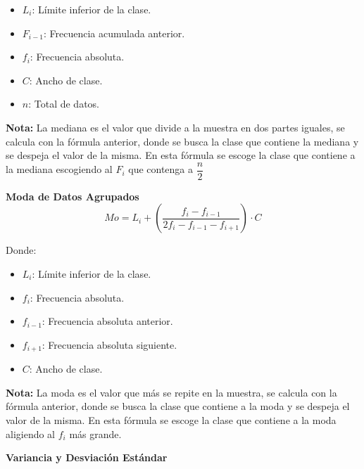 \documentclass[11pt, a4paper]{article}
\newenvironment{medianaDatosAgrupados}{}{}
\newenvironment{modaDatosAgrupados}{}{}
\newenvironment{varianciaYDesviacionEstandar}{}{}
\begin{document}
\begin{multicols}{2}
\begin{medianaDatosAgrupados}
\begin{itemize}
            \item $L_i$: Límite inferior de la clase.
            \item $F_{i-1}$: Frecuencia acumulada anterior.
            \item $f_i$: Frecuencia absoluta.
            \item $C$: Ancho de clase.
            \item $n$: Total de datos.
        \end{itemize}
        \textbf{Nota:}
        La mediana es el valor que divide a la muestra en dos partes iguales, se calcula con la fórmula anterior, donde se busca la clase que contiene la mediana y se despeja el valor de la misma. En esta fórmula se escoge la clase que contiene a la mediana escogiendo al $F_i$ que contenga a $\dfrac{n}{2}$
    \end{medianaDatosAgrupados}
    \pagebreak
    \begin{modaDatosAgrupados}
        \begin{center}
            \textbf{\large Moda de Datos Agrupados}
            \hrulefill
            \begin{equation*}
                Mo = L_i + \left( \frac{f_i - f_{i-1}}{2f_i - f_{i-1} - f_{i+1}} \right) \cdot C
            \end{equation*}
        \end{center}
        \vspace{-1cm}
        Donde:
        \begin{itemize}
            \item $L_i$: Límite inferior de la clase.
            \item $f_i$: Frecuencia absoluta.
            \item $f_{i-1}$: Frecuencia absoluta anterior.
            \item $f_{i+1}$: Frecuencia absoluta siguiente.
            \item $C$: Ancho de clase.
        \end{itemize}
        \textbf{Nota:}
        La moda es el valor que más se repite en la muestra, se calcula con la fórmula anterior, donde se busca la clase que contiene a la moda y se despeja el valor de la misma. En esta fórmula se escoge la clase que contiene a la moda aligiendo al $f_i$ más grande.
    \end{modaDatosAgrupados}
    \begin{varianciaYDesviacionEstandar}
        \begin{center}
            \textbf{\large Variancia y Desviación Estándar}

\end{center}
\end{varianciaYDesviacionEstandar}
\end{multicols}
\end{document}
